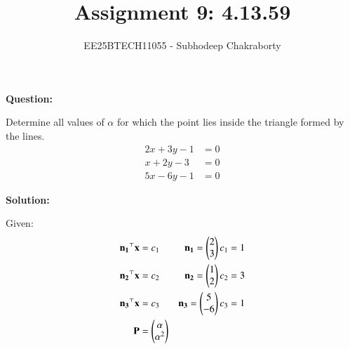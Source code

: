 \documentclass[journal,12pt,onecolumn]{IEEEtran}
\theoremstyle{remark}
\begin{document}

\vspace{3cm}

\title{Assignment 9: 4.13.59}
\author{EE25BTECH11055 - Subhodeep Chakraborty}
\maketitle
\hrulefill
\bigskip

\renewcommand{\thefigure}{\theenumi}
\renewcommand{\thetable}{\theenumi}

\textbf{Question:}\par
Determine all values of $\alpha$ for which the point  lies inside the triangle formed by the lines. \hfill{}
\begin{align*}
 2x+3y-1&=0\\
 x+2y-3&=0\\
 5x-6y-1&=0
\end{align*}
\par
\textbf{Solution:}\par

Given:
\begin{align}
 \mathbf{n_1}^\top\mathbf{x}&=c_1 &\mathbf{n_1}=\begin{pmatrix}2\\3\end{pmatrix} c_1 = 1 \\
 \mathbf{n_2}^\top\mathbf{x}&=c_2 &\mathbf{n_2}=\begin{pmatrix}1\\2\end{pmatrix} c_2 = 3 \\
 \mathbf{n_3}^\top\mathbf{x}&=c_3 &\mathbf{n_3}=\begin{pmatrix}5\\-6\end{pmatrix} c_3 = 1 \\
 \mathbf{P} &= \begin{pmatrix}\alpha \\ \alpha^2\end{pmatrix} &
\end{align}
\end{document}
